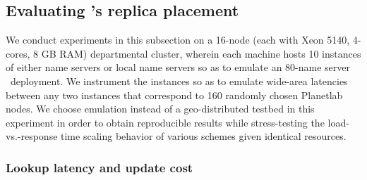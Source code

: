 




\vsp
\subsection{Evaluating \auspice's replica placement}
\label{sec:comparison}

We conduct experiments in this subsection on a 16-node (each with Xeon 5140, 4-cores, 8 GB RAM) departmental cluster, wherein each machine hosts 10 instances of either name servers or local name servers so as to emulate an 80-name server \auspice\ deployment. We instrument the instances so as to emulate wide-area latencies between any two instances that correspond to 160 randomly chosen Planetlab nodes. We choose emulation instead of a geo-distributed testbed in this experiment in order to obtain reproducible results while stress-testing the load-vs.-response time scaling behavior of various schemes given identical resources.

\vsp
\subsubsection{Lookup latency and update cost}
\label{sec:lookup}
\label{sec:lowload}

